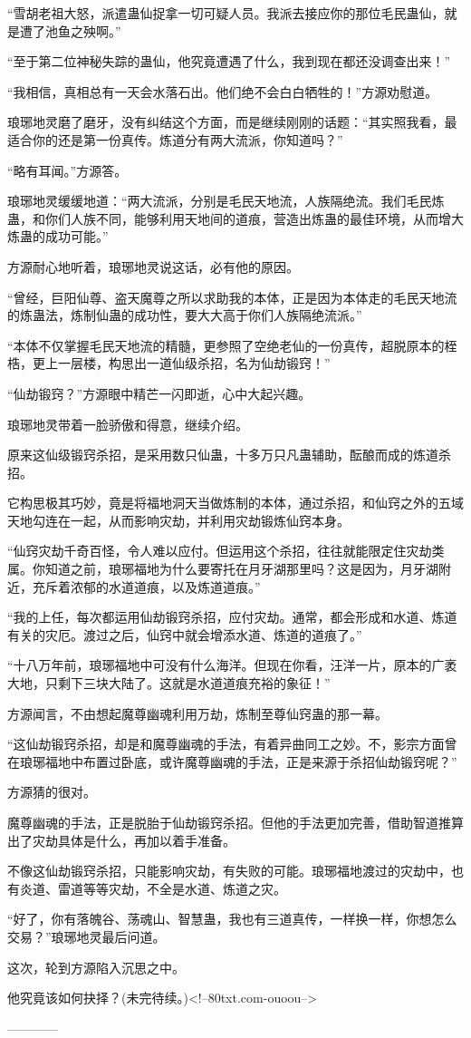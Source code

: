 \begin{this_body}
“雪胡老祖大怒，派遣蛊仙捉拿一切可疑人员。我派去接应你的那位毛民蛊仙，就是遭了池鱼之殃啊。”

“至于第二位神秘失踪的蛊仙，他究竟遭遇了什么，我到现在都还没调查出来！”

“我相信，真相总有一天会水落石出。他们绝不会白白牺牲的！”方源劝慰道。

琅琊地灵磨了磨牙，没有纠结这个方面，而是继续刚刚的话题：“其实照我看，最适合你的还是第一份真传。炼道分有两大流派，你知道吗？”

“略有耳闻。”方源答。

琅琊地灵缓缓地道：“两大流派，分别是毛民天地流，人族隔绝流。我们毛民炼蛊，和你们人族不同，能够利用天地间的道痕，营造出炼蛊的最佳环境，从而增大炼蛊的成功可能。”

方源耐心地听着，琅琊地灵说这话，必有他的原因。

“曾经，巨阳仙尊、盗天魔尊之所以求助我的本体，正是因为本体走的毛民天地流的炼蛊法，炼制仙蛊的成功性，要大大高于你们人族隔绝流派。”

“本体不仅掌握毛民天地流的精髓，更参照了空绝老仙的一份真传，超脱原本的桎梏，更上一层楼，构思出一道仙级杀招，名为仙劫锻窍！”

“仙劫锻窍？”方源眼中精芒一闪即逝，心中大起兴趣。

琅琊地灵带着一脸骄傲和得意，继续介绍。

原来这仙级锻窍杀招，是采用数只仙蛊，十多万只凡蛊辅助，酝酿而成的炼道杀招。

它构思极其巧妙，竟是将福地洞天当做炼制的本体，通过杀招，和仙窍之外的五域天地勾连在一起，从而影响灾劫，并利用灾劫锻炼仙窍本身。

“仙窍灾劫千奇百怪，令人难以应付。但运用这个杀招，往往就能限定住灾劫类属。你知道之前，琅琊福地为什么要寄托在月牙湖那里吗？这是因为，月牙湖附近，充斥着浓郁的水道道痕，以及炼道道痕。”

“我的上任，每次都运用仙劫锻窍杀招，应付灾劫。通常，都会形成和水道、炼道有关的灾厄。渡过之后，仙窍中就会增添水道、炼道的道痕了。”

“十八万年前，琅琊福地中可没有什么海洋。但现在你看，汪洋一片，原本的广袤大地，只剩下三块大陆了。这就是水道道痕充裕的象征！”

方源闻言，不由想起魔尊幽魂利用万劫，炼制至尊仙窍蛊的那一幕。

“这仙劫锻窍杀招，却是和魔尊幽魂的手法，有着异曲同工之妙。不，影宗方面曾在琅琊福地中布置过卧底，或许魔尊幽魂的手法，正是来源于杀招仙劫锻窍呢？”

方源猜的很对。

魔尊幽魂的手法，正是脱胎于仙劫锻窍杀招。但他的手法更加完善，借助智道推算出了灾劫具体是什么，再加以着手准备。

不像这仙劫锻窍杀招，只能影响灾劫，有失败的可能。琅琊福地渡过的灾劫中，也有炎道、雷道等等灾劫，不全是水道、炼道之灾。

“好了，你有落魄谷、荡魂山、智慧蛊，我也有三道真传，一样换一样，你想怎么交易？”琅琊地灵最后问道。

这次，轮到方源陷入沉思之中。

他究竟该如何抉择？(未完待续。)<!--80txt.com-ouoou-->

------------

\end{this_body}

